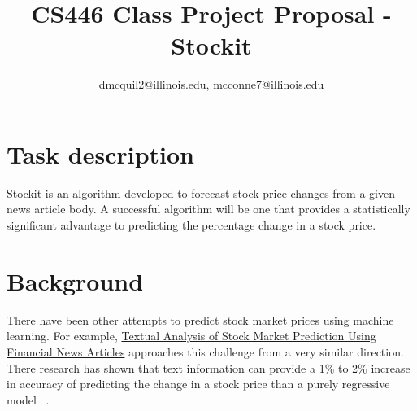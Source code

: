 \documentclass[11pt,letterpaper]{article}
\newcommand{\blue}[1]{\textcolor{RoyalBlue}{#1}}
\newcommand{\instructions}[1]{\blue{\textit{#1}}}
\renewcommand{\instructions}[1]{}
\begin{document}
\title{CS446 Class Project Proposal - Stockit}
\author{dmcquil2@illinois.edu, mcconne7@illinois.edu}
\maketitle



\instructions{If you are taking CS446 for 4 hours credit, you need to
  do a research project.\\
This is a \LaTeX template for the initial proposal,  but should also give you a start on the final report.\\
The blue pieces of text  in this template are either instructions ({\tt$\backslash$instructions\{...\}}) or indicate where you need to fill in something ({\tt$\backslash$fillme\{...\}}).  
You should replace all the {\tt$\backslash$fillme\{...\}} commands with your own text.
To make the instructions disappear, please uncomment the 
\begin{center}
{\tt$\backslash$renewcommand\{$\backslash$instructions\}[1]\{\}}\\
\end{center}
lines in the preamble (just above {\tt $\backslash$begin\{document\}} of this .tex file) by removing the leading \% marks,
recompile (run \LaTeX again) and submit the PDF on Compass.\\
The template for the final report is at
\url{http://courses.engr.illinois.edu/cs446/Projects/CS446proj.tex}
(or
\url{http://courses.engr.illinois.edu/cs446/Projects/CS446proj.pdf}
for the pdf)
}
\section*{Task description}
  Stockit is an algorithm developed to forecast stock price changes from
  a given news article body. A successful algorithm will be one that provides
  a statistically significant advantage to predicting the percentage change
  in a stock price.
\instructions{Describe the task you want to tackle in your project.}

\section*{Background}
  There have been other attempts to predict stock market prices using
  machine learning. For example,
  \href{http://ailab.arizona.edu/intranet/papers/Textual\%20Analysis\%20of\%20Stock\%20Market.pdf}
    {Textual Analysis of Stock Market Prediction Using Financial News Articles}
  approaches this challenge from a very similar direction. There research
  has shown that text information can provide a 1\% to 2\% increase in accuracy of
  predicting the change in a stock price than a purely regressive model ~\cite{arizona}.
\instructions{Has there been any prior work on this task? If so,
  provide references where available}
\end{document}
